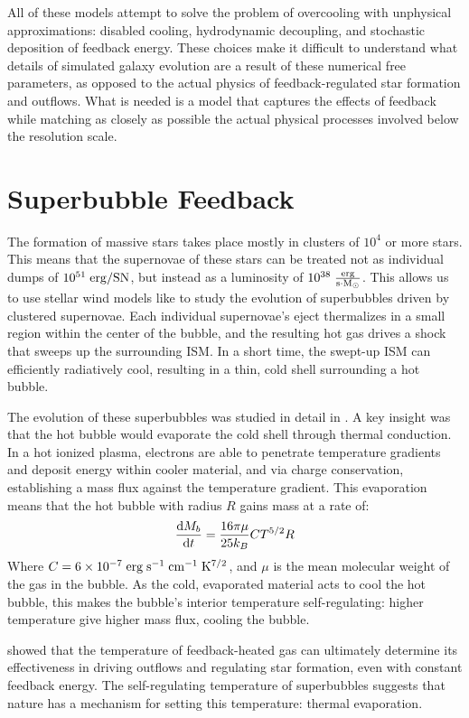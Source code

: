 All of these models attempt to solve the problem of overcooling with unphysical
approximations: disabled cooling, hydrodynamic decoupling, and stochastic
deposition of feedback energy.  These choices make it difficult to understand
what details of simulated galaxy evolution are a result of these numerical free
parameters, as opposed to the actual physics of feedback-regulated star
formation and outflows.  What is needed is a model that captures the effects of
feedback while matching as closely as possible the actual physical processes
involved below the resolution scale.

\section{Superbubble Feedback}
The formation of massive stars takes place mostly in clusters of $10^4$ or more
stars.  This means that the supernovae of these stars can be treated not as
individual dumps of $10^{51}\;\rm{erg/SN}$, but instead as a luminosity of
$10^{38}\;\rm{\frac{erg}{s \cdot M_\odot}}$.  This allows us to use stellar wind
models like \citet{Weaver1977} to study the evolution of superbubbles driven by
clustered supernovae.  Each individual supernovae's eject thermalizes in a small
region within the center of the bubble, and the resulting hot gas drives a shock
that sweeps up the surrounding ISM.  In a short time, the swept-up ISM can
efficiently radiatively cool, resulting in a thin, cold shell surrounding a hot
bubble.

The evolution of these superbubbles was studied in detail in \citet{MacLow1988}.
A key insight was that the hot bubble would evaporate the cold shell through
thermal conduction.  In a hot ionized plasma, electrons are able to penetrate
temperature gradients and deposit energy within cooler material, and via charge
conservation, establishing a mass flux against the temperature gradient.  This
evaporation means that the hot bubble with radius $R$ gains mass at a rate of:
\begin{equation}
    \frac{{\rm d }M_b}{{\rm d}t} = \frac{16\pi\mu}{25k_B} CT^{5/2}R
\end{equation}
Where $C=6\times10^{-7}\;\rm{erg\;s^{-1}\;cm^{-1}\;K^{7/2}}$, and $\mu$ is the
mean molecular weight of the gas in the bubble.  As the cold, evaporated
material acts to cool the hot bubble, this makes the bubble's interior
temperature self-regulating: higher temperature give higher mass flux, cooling
the bubble.

\citet{DallaVecchia2012} showed that the temperature of feedback-heated gas can
ultimately determine its effectiveness in driving outflows and regulating star
formation, even with constant feedback energy.  The self-regulating temperature
of superbubbles suggests that nature has a mechanism for setting
this temperature: thermal evaporation.


